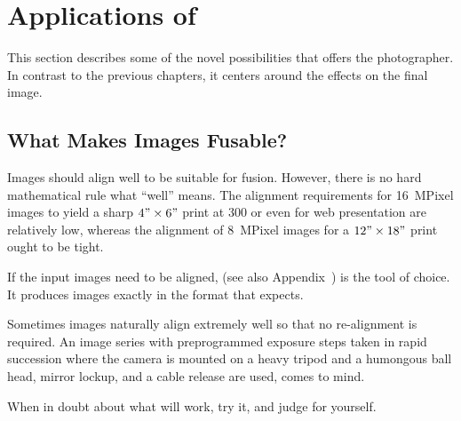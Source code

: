 

\chapter[Applications of \App]{\label{sec:applications}%
  Applications of \App}

This section describes some of the novel possibilities that \App{} offers the photographer.  In
contrast to the previous chapters, it centers around the effects on the final image.

\section[What Makes Images Fusable?]{\label{sec:what-makes-images-fusable}%
  What Makes Images Fusable?}

\begin{sloppypar}
  Images should align well to be suitable for fusion.  However, there is no hard mathematical
  rule what ``well'' means.  The alignment requirements for 16~MPixel images to yield a sharp
  $4" \times 6"$ print at 300 or even for web presentation are relatively low, whereas
  the alignment of 8~MPixel images for a $12" \times 18"$ print ought to be tight.
\end{sloppypar}

If the input images need to be aligned,  (see also
Appendix~) is the tool of choice.  It produces images exactly in the format
that \App{} expects.

Sometimes images naturally align extremely well so that no re-alignment is required.  An image
series with preprogrammed exposure steps taken in rapid succession where the camera is mounted
on a heavy tripod and a humongous ball head, mirror lockup, and a cable release are used, comes
to mind.

When in doubt about what will work, try it, and judge for yourself.

